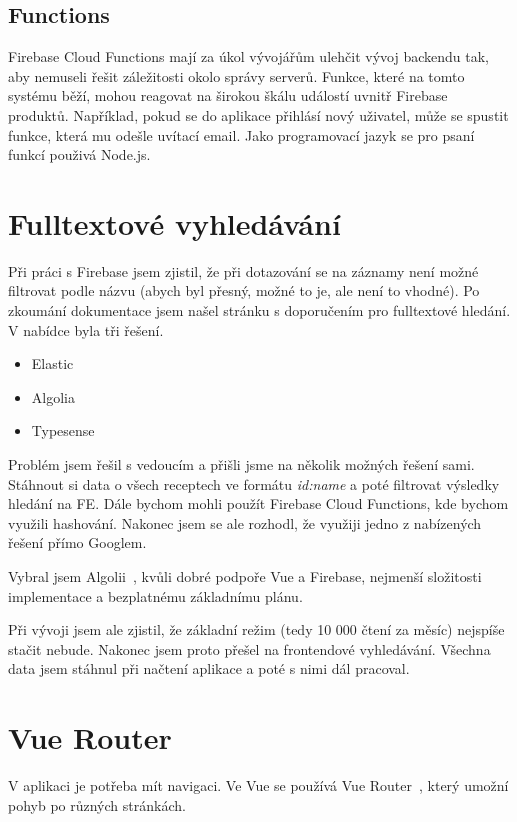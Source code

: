 \subsection{Functions}
Firebase Cloud Functions mají za úkol vývojářům ulehčit vývoj backendu tak, aby nemuseli řešit záležitosti okolo správy serverů.
Funkce, které na tomto systému běží, mohou reagovat na širokou škálu událostí uvnitř Firebase produktů. Například, pokud se do aplikace
přihlásí nový uživatel, může se spustit funkce, která mu odešle uvítací email. Jako programovací jazyk se pro psaní funkcí použivá Node.js.~\cite{FirebaseFunctions}

\section{Fulltextové vyhledávání}
Při práci s Firebase jsem zjistil, že při dotazování se na záznamy není možné filtrovat podle názvu
(abych byl přesný, možné to je, ale není to vhodné). Po zkoumání dokumentace jsem našel stránku s doporučením pro
fulltextové hledání. V nabídce byla tři řešení.~\cite{FulltextSearch}

\begin{itemize}
    \item Elastic
    \item Algolia
    \item Typesense
\end{itemize}

Problém jsem řešil s vedoucím a přišli jsme na několik možných řešení sami. Stáhnout si data o všech receptech ve formátu
\emph{id:name} a poté filtrovat výsledky hledání na FE. Dále bychom mohli použít Firebase Cloud Functions, kde bychom
využili hashování. Nakonec jsem se ale rozhodl, že využiji jedno z nabízených řešení přímo Googlem.

Vybral jsem Algolii~\cite{Algolia}, kvůli dobré podpoře Vue a Firebase, nejmenší složitosti implementace a bezplatnému základnímu plánu.

Při vývoji jsem ale zjistil, že základní režim (tedy 10 000 čtení za měsíc) nejspíše stačit nebude. Nakonec jsem proto přešel na
frontendové vyhledávání. Všechna data jsem stáhnul při načtení aplikace a poté s nimi dál pracoval.

\section{Vue Router} %
V aplikaci je potřeba mít navigaci. Ve Vue se používá Vue Router~\cite{VueRouter}, který umožní pohyb po různých stránkách.


